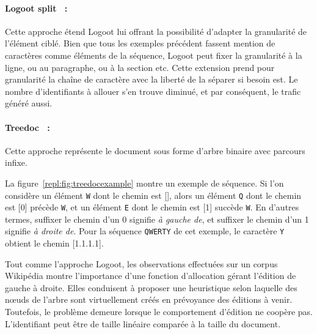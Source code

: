 \paragraph{Logoot split~\cite{andre2013supporting} :} Cette approche étend
Logoot lui offrant la possibilité d'adapter la granularité de l'élément
ciblé. Bien que tous les exemples précédent fassent mention de caractères comme
éléments de la séquence, Logoot peut fixer la granularité à la ligne, ou au
paragraphe, ou à la section etc. Cette extension prend pour granularité la
chaîne de caractère avec la liberté de la séparer si besoin est. Le nombre
d'identifiants à allouer s'en trouve diminué, et par conséquent, le trafic
généré aussi.

\paragraph{Treedoc~\cite{letia2009crdts, preguica2009commutative} :} Cette
approche représente le document sous forme d'arbre binaire avec parcours infixe.
  
\begin{figure*}
  \begin{center}
    
    \caption[Chemins alloués par Treedoc]
    {\label{repl:fig:treedocexample}Exemple de séquence dont les chemins sont
      alloués grâce à Treedoc.}
  \end{center}
\end{figure*}

\noindent La figure~\ref{repl:fig:treedocexample} montre un exemple de
séquence. Si l'on considère un élément \texttt{W} dont le chemin est [], alors
un élément \texttt{Q} dont le chemin est [0] précède \texttt{W}, et un élément
\texttt{E} dont le chemin est [1] succède \texttt{W}. En d'autres termes,
suffixer le chemin d'un 0 signifie \emph{à gauche de}, et suffixer le chemin
d'un 1 signifie \emph{à droite de}. Pour la séquence \texttt{QWERTY} de cet
exemple, le caractère \texttt{Y} obtient le chemin [1.1.1.1].
  
\noindent Tout comme l'approche Logoot, les observations effectuées sur un
corpus Wikipédia montre l'importance d'une fonction d'allocation gérant
l'édition de gauche à droite. Elles conduisent à proposer une heuristique selon
laquelle des nœuds de l'arbre sont virtuellement créés en prévoyance des
éditions à venir. Toutefois, le problème demeure lorsque le comportement
d'édition ne coopère pas. L'identifiant peut être de taille linéaire comparée à
la taille du document.



